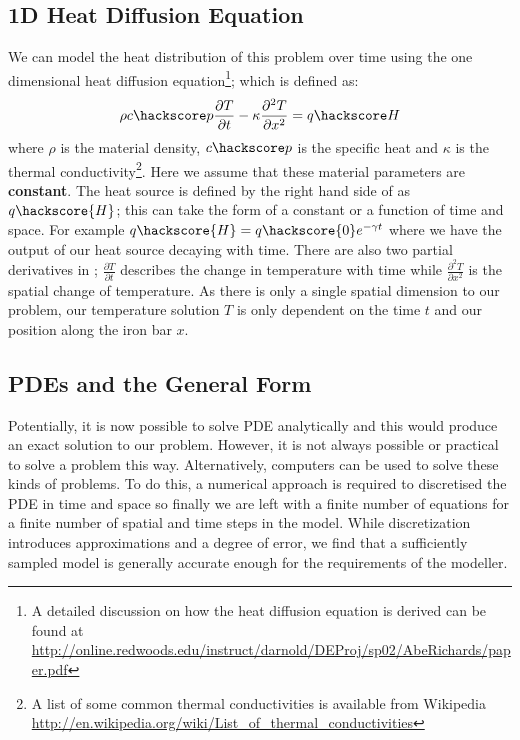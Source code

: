 \subsection{1D Heat Diffusion Equation}
We can model the heat distribution of this problem over time using the one dimensional heat diffusion equation\footnote{A detailed discussion on how the heat diffusion equation is derived can be found at \url{http://online.redwoods.edu/instruct/darnold/DEProj/sp02/AbeRichards/paper.pdf}};
which is defined as:
\begin{equation}
\rho c\hackscore p \frac{\partial T}{\partial t} - \kappa \frac{\partial^{2} T}{\partial x^{2}} = q\hackscore H 
\label{eqn:hd}
\end{equation}
where $\rho$ is the material density, $c\hackscore p$ is the specific heat and $\kappa$ is the thermal 
conductivity\footnote{A list of some common thermal conductivities is available from Wikipedia \url{http://en.wikipedia.org/wiki/List_of_thermal_conductivities}}. Here we assume that these material 
parameters are \textbf{constant}. 
The heat source is defined by the right hand side of  as $q\hackscore{H}$; this can take the form of a constant or a function of time and space. For example $q\hackscore{H} = q\hackscore{0}e^{-\gamma t}$ where we have the output of our heat source decaying with time. There are also two partial derivatives in ; $\frac{\partial T}{\partial t}$ describes the change in temperature with time while $\frac{\partial ^2 T}{\partial x^2}$ is the spatial change of temperature. As there is only a single spatial dimension to our problem, our temperature solution $T$ is only dependent on the time $t$ and our position along the iron bar $x$.

\subsection{PDEs and the General Form}
Potentially, it is now possible to solve PDE  analytically and this would produce an exact solution to our problem. However, it is not always possible or practical to solve a problem this way. Alternatively, computers can be used to solve these kinds of problems. To do this, a numerical approach is required to discretised 
the PDE  in time and space so finally we are left with a finite number of equations for a finite number of spatial and time steps in the model. While discretization introduces approximations and a degree of error, we find that a sufficiently sampled model is generally accurate enough for the requirements of the modeller.

